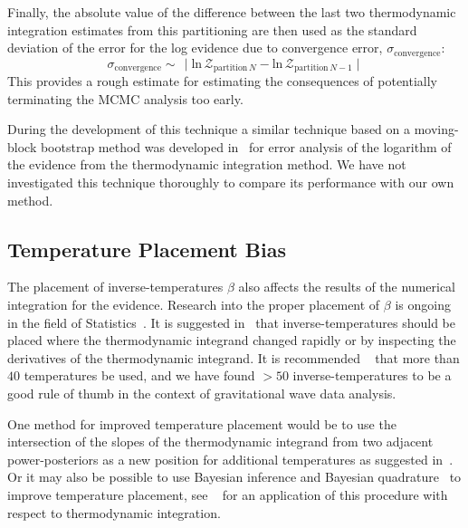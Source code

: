 Finally, the absolute value of the difference between the last two thermodynamic integration estimates from this partitioning are then used as the standard deviation of the error for the log evidence due to convergence error, $\sigma_{\mathrm{convergence}}$:
\begin{equation}
    \sigma_{\mathrm{convergence}} \sim  \, \mid \mathrm{ln} \, \mathcal{Z}_{\mathrm{partition \,} N} - \mathrm{ln} \, \mathcal{Z}_{\mathrm{partition \,} N-1} \mid
\end{equation}
This provides a rough estimate for estimating the consequences of potentially terminating the MCMC analysis too early.

During the development of this technique a similar technique based on a moving-block bootstrap method was developed in~\cite{Russel:2018pqv} for error analysis of the logarithm of the evidence from the thermodynamic integration method. We have not investigated this technique thoroughly to compare its performance with our own method.

\subsection{Temperature Placement Bias}
The placement of inverse-temperatures $\beta$ also affects the results of the numerical integration for the evidence\citep{lartillot2006computing, xie2010improving}. Research into the proper placement of $\beta$ is ongoing in the field of Statistics~\citep{calderhead2009estimating, annis2019thermodynamic}. It is suggested in~\cite{liu2016evaluating, de2013comparison} that inverse-temperatures should be placed where the thermodynamic integrand changed rapidly or by inspecting the derivatives of the thermodynamic integrand. It is recommended ~\cite{annis2019thermodynamic} that more than $40$ temperatures be used, and we have found $>50$ inverse-temperatures to be a good rule of thumb in the context of gravitational wave data analysis. 

One method for improved temperature placement would be to use the intersection of the slopes of the thermodynamic integrand from two adjacent power-posteriors as a new position for additional temperatures as suggested in~\cite{friel2014improving}. Or it may also be possible to use Bayesian inference and Bayesian quadrature~\cite{diaconis1988bayesian} to improve temperature placement, see ~\cite{briol2015probabilistic} for an application of this procedure with respect to thermodynamic integration.

